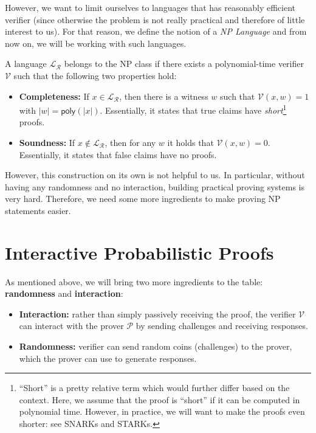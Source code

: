 \documentclass[../lecture-notes.tex]{subfiles}
\begin{document}
However, we want to limit ourselves to languages that has reasonably efficient verifier (since otherwise the problem is not really practical and therefore of little interest to us). For that reason, we define the notion of a \emph{NP Language} and from now on, we will be working with such languages.

\begin{definition}[NP Language]
    A language $\mathcal{L}_{\mathcal{R}}$ belongs to the NP class if there exists a polynomial-time verifier $\mathcal{V}$ such that the following two properties hold:
    \begin{itemize}
        \item \textbf{Completeness:} If $x \in \mathcal{L}_{\mathcal{R}}$, then there is a witness $w$ such that $\mathcal{V}(x, w) = 1$ with $|w| = \mathsf{poly}(|x|)$. Essentially, it states that true claims have \textit{short}\footnote{``Short'' is a pretty relative term which would further differ based on the context. Here, we assume that the proof is ``short'' if it can be computed in polynomial time. However, in practice, we will want to make the proofs even shorter: see SNARKs and STARKs.} proofs.
        \item \textbf{Soundness:} If $x \not\in \mathcal{L}_{\mathcal{R}}$, then for any $w$ it holds that $\mathcal{V}(x, w) = 0$. Essentially, it states that false claims have no proofs.
    \end{itemize}
\end{definition}

However, this construction on its own is not helpful to us. In particular, without having any randomness and no interaction, building practical proving systems is very hard. Therefore, we need some more ingredients to make proving NP statements easier.

\section{Interactive Probabilistic Proofs}

As mentioned above, we will bring two more ingredients to the table: \textbf{randomness} and \textbf{interaction}:
\begin{itemize}
    \item \textbf{Interaction:} rather than simply passively receiving the proof, the verifier $\mathcal{V}$ can interact with the prover $\mathcal{P}$ by sending challenges and receiving responses.
    \item \textbf{Randomness:} verifier can send random coins (challenges) to the prover, which the prover can use to generate responses.
\end{itemize}
\end{document}
